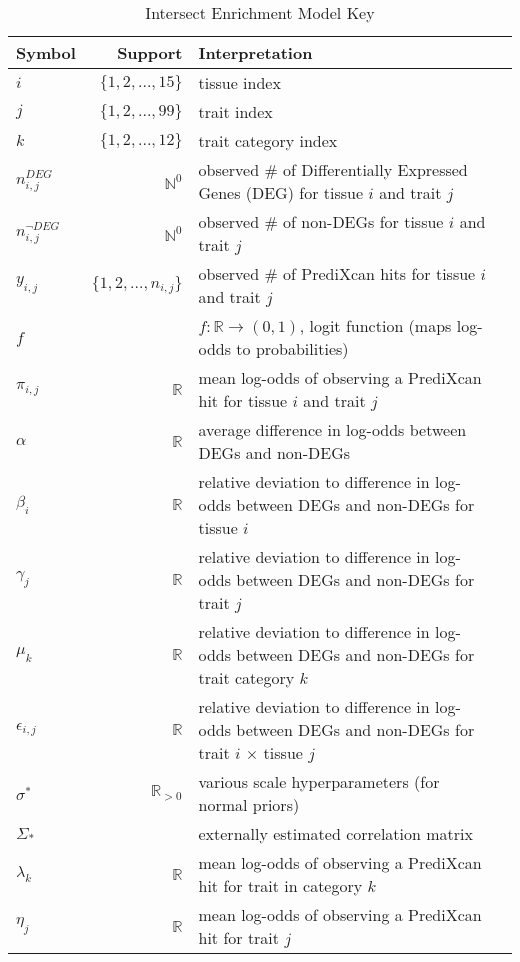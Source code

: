 \documentclass{article}
\numberwithin{equation}{section}
\begin{document}
\begin{table}[htbp]
\caption{Intersect Enrichment Model Key}
\centering
\begin{tabular}{l r p{12cm}r}
\toprule 
Symbol & Support & Interpretation \\
\midrule
$i$ & $\{1,2,...,15\}$ & tissue index  \\
$j$ & $\{1,2,...,99\}$ & trait index  \\
$k$ & $\{1,2,...,12\}$ & trait category index  \\
$n^{DEG}_{i,j}$ & $\mathbb{N}^0$ & observed \# of Differentially Expressed Genes (DEG) for tissue $i$ and trait $j$\\
$n^{\neg DEG}_{i,j}$ & $\mathbb{N}^0$ & observed \# of non-DEGs for tissue $i$ and trait $j$\\
$y_{i,j}$ & $\{1,2,...,n_{i,j}\}$ & observed \# of PrediXcan hits for tissue $i$ and trait $j$\\
$f$ & & $f: \mathbb{R} \rightarrow (0, 1)$, logit function (maps log-odds to probabilities)  \\
$\pi_{i,j}$ & $\mathbb{R}$ & mean log-odds of observing a PrediXcan hit for tissue $i$ and trait $j$\\
$\alpha$ & $\mathbb{R}$ & average difference in log-odds between DEGs and non-DEGs\\
$\beta_i$ & $\mathbb{R}$ & relative deviation to difference in log-odds between DEGs and non-DEGs for tissue $i$\\
$\gamma_j$ & $\mathbb{R}$ & relative deviation to difference in log-odds between DEGs and non-DEGs for trait $j$\\
$\mu_k$ & $\mathbb{R}$ &  relative deviation to difference in log-odds between DEGs and non-DEGs for trait category $k$\\
$\epsilon_{i,j}$ & $\mathbb{R}$ &  relative deviation to difference in log-odds between DEGs and non-DEGs for trait $i$ $\times$ tissue $j$\\
$\sigma^{*}$ & $\mathbb{R}_{>0}$ & various scale hyperparameters (for normal priors)\\
$\Sigma_{*}$ & & externally estimated correlation matrix\\
$\lambda_k$ & $\mathbb{R}$ & mean log-odds of observing a PrediXcan hit for trait in category $k$\\
$\eta_j$ & $\mathbb{R}$ & mean log-odds of observing a PrediXcan hit for trait $j$\\
\bottomrule
\end{tabular}
\end{table}
\end{document}
